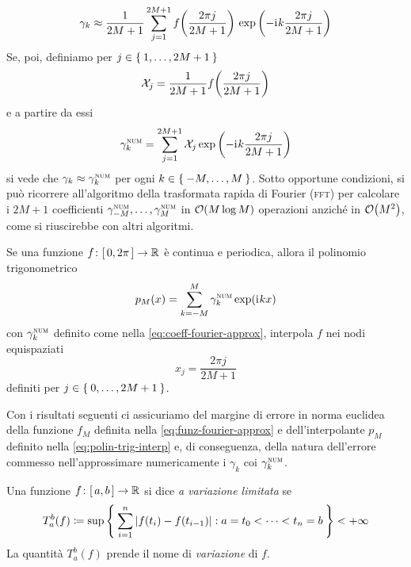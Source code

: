 	\begin{equation}
		\gamma_k \approx \frac{1}{2 M + 1} \sum_{j = 1}^{2 M + 1} f \qty(\frac{2 \pi j}{2 M + 1}) \, \exp \qty(- \mathrm{i}\mkern1mu k \frac{2 \pi j}{2 M + 1})
	\end{equation}
	Se, poi, definiamo per \(j \in \Set{1, \dots, 2 M + 1}\)
	\begin{equation*}
		\mathcal{X}_j = \frac{1}{2 M + 1} f \qty(\frac{2 \pi j}{2 M + 1})
	\end{equation*}
	e a partire da essi
	\begin{equation}\label{eq:coeff-fourier-approx}
		\gamma_{k}^{\textup{\textsc{num}}} = \sum_{j = 1}^{2 M + 1} \mathcal{X}_j \exp \qty(- \mathrm{i}\mkern1mu k \frac{2 \pi j}{2 M + 1})
	\end{equation}
	si vede che \(\gamma_k \approx \gamma_{k}^{\textup{\textsc{num}}}\) per ogni \(k \in \Set{-M, \dots, M}\). Sotto opportune condizioni, si può ricorrere all'algoritmo della trasformata rapida di Fourier (\textsc{fft}) per calcolare i \(2 M + 1\) coefficienti \(\gamma_{-M}^{\textup{\textsc{num}}}, \dots, \gamma_{M}^{\textup{\textsc{num}}}\) in \(\order{M \log M}\) operazioni anziché in \(\order{M^2}\), come si riuscirebbe con altri algoritmi.
	
	\begin{teorema}\label{th:polin-trig-interp}
		Se una funzione \(f \colon [\, 0, 2 \pi \,] \to \mathbb{R}\) è continua e periodica, allora il polinomio trigonometrico
		\begin{equation}\label{eq:polin-trig-interp}
			p_M (x) = \sum_{k = - M}^M \gamma_{k}^{\textup{\textsc{num}}} \exp(\mathrm{i}\mkern1mu k x)
		\end{equation}
		con \(\gamma_{k}^{\textup{\textsc{num}}}\) definito come nella \eqref{eq:coeff-fourier-approx}, interpola \(f\) nei nodi equispaziati
		\begin{equation*}
			x_j = \frac{2 \pi j}{2 M + 1}
		\end{equation*}
		definiti per \(j \in \Set{0, \dots, 2 M + 1}\).
	\end{teorema}

	Con i risultati seguenti ci assicuriamo del margine di errore in norma euclidea della funzione \(f_M\) definita nella \eqref{eq:funz-fourier-approx} e dell'interpolante \(p_M\) definito nella \eqref{eq:polin-trig-interp} e, di conseguenza, della natura dell'errore commesso nell'approssimare numericamente i \(\gamma_k\) coi \(\gamma_{k}^{\textup{\textsc{num}}}\).
	
	\begin{definizione}\label{def:variaz-limit}
		Una funzione \(f \colon [\, a, b \,] \to \mathbb{R}\) si dice \emph{a variazione limitata} se
		\begin{equation}
			T_a^b (f) \coloneqq \sup \Set{\sum_{i = 1}^n \abs{f (t_i) - f (t_{i - 1})} : a = t_0 < \dots < t_n = b} < + \infty
		\end{equation}
		La quantità \(T_a^b (f)\) prende il nome di \emph{variazione} di \(f\).
	\end{definizione}

